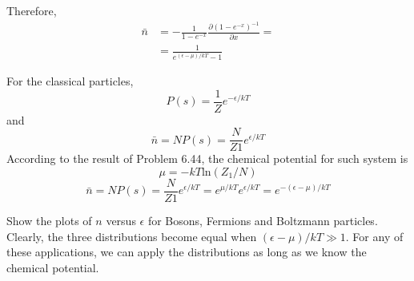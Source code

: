 Therefore,
\begin{equation}
\begin{split}
\bar{n} & = -\frac{1}{1-e^{-x}}\frac{\partial (1-e^{-x})^{-1}}{\partial x} = \\
        & = \frac{1}{e^{(\epsilon-\mu)/kT}-1}
\end{split}
\end{equation}

For the classical particles,
\begin{equation}
P(s) = \frac{1}{Z} e^{-\epsilon/kT}
\end{equation}
and
\begin{equation}
\bar{n} = NP(s) = \frac{N}{Z1}e^{\epsilon/kT}
\end{equation}
According to the result of Problem 6.44, the chemical potential for such system is
\begin{equation}
\mu = -kT\textrm{ln}(Z_1/N)
\end{equation}
\begin{equation}
\bar{n} = NP(s) = \frac{N}{Z1}e^{\epsilon/kT}=e^{\mu/kT}e^{\epsilon/kT} = e^{-(\epsilon-\mu)/kT}
\end{equation}


Show the plots of $n$ versus $\epsilon$ for Bosons, Fermions and Boltzmann particles.
Clearly, the three distributions become equal when $(\epsilon-\mu)/kT \gg 1$.
For any of these applications, we can apply the distributions as long as we know the chemical potential.


